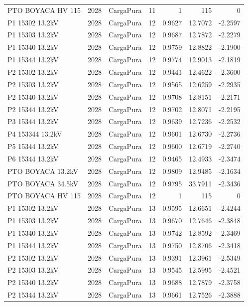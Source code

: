 \documentclass[11pt,a4paper]{article}
\begin{document}
\begin{longtable}{llllrrr}
PTO BOYACA HV 115 & 2028 & CargaPura & 11 & 1 & 115 & 0 \\
P1 15302 13.2kV & 2028 & CargaPura & 12 & 0.9627 & 12.7072 & -2.2597 \\
P1 15303 13.2kV & 2028 & CargaPura & 12 & 0.9687 & 12.7872 & -2.2279 \\
P1 15340 13.2kV & 2028 & CargaPura & 12 & 0.9759 & 12.8822 & -2.1900 \\
P1 15344 13.2kV & 2028 & CargaPura & 12 & 0.9774 & 12.9013 & -2.1819 \\
P2 15302 13.2kV & 2028 & CargaPura & 12 & 0.9441 & 12.4622 & -2.3600 \\
P2 15303 13.2kV & 2028 & CargaPura & 12 & 0.9565 & 12.6259 & -2.2935 \\
P2 15340 13.2kV & 2028 & CargaPura & 12 & 0.9708 & 12.8151 & -2.2171 \\
P2 15344 13.2kV & 2028 & CargaPura & 12 & 0.9702 & 12.8071 & -2.2195 \\
P3 15344 13.2kV & 2028 & CargaPura & 12 & 0.9639 & 12.7236 & -2.2532 \\
P4 153344 13.2kV & 2028 & CargaPura & 12 & 0.9601 & 12.6730 & -2.2736 \\
P5 15344 13.2kV & 2028 & CargaPura & 12 & 0.9600 & 12.6719 & -2.2740 \\
P6 15344 13.2kV & 2028 & CargaPura & 12 & 0.9465 & 12.4933 & -2.3474 \\
PTO BOYACA 13.2kV & 2028 & CargaPura & 12 & 0.9809 & 12.9485 & -2.1634 \\
PTO BOYACA 34.5kV & 2028 & CargaPura & 12 & 0.9795 & 33.7911 & -2.3436 \\
PTO BOYACA HV 115 & 2028 & CargaPura & 12 & 1 & 115 & 0 \\
P1 15302 13.2kV & 2028 & CargaPura & 13 & 0.9595 & 12.6651 & -2.4244 \\
P1 15303 13.2kV & 2028 & CargaPura & 13 & 0.9670 & 12.7646 & -2.3848 \\
P1 15340 13.2kV & 2028 & CargaPura & 13 & 0.9742 & 12.8592 & -2.3469 \\
P1 15344 13.2kV & 2028 & CargaPura & 13 & 0.9750 & 12.8706 & -2.3418 \\
P2 15302 13.2kV & 2028 & CargaPura & 13 & 0.9391 & 12.3961 & -2.5349 \\
P2 15303 13.2kV & 2028 & CargaPura & 13 & 0.9545 & 12.5995 & -2.4521 \\
P2 15340 13.2kV & 2028 & CargaPura & 13 & 0.9688 & 12.7879 & -2.3758 \\
P2 15344 13.2kV & 2028 & CargaPura & 13 & 0.9661 & 12.7526 & -2.3888 \\

\end{longtable}
\end{document}
